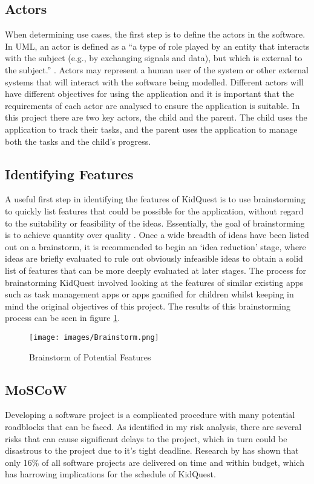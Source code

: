 \subsection{Actors}
When determining use cases, the first step is to define the actors in the software.
In UML, an actor is defined as a ``a type of role played by an entity that interacts with the subject (e.g., by exchanging signals and data), but which is external to the subject.'' \citep[p586-588]{omg2007unified}.
Actors may represent a human user of the system or other external systems that will interact with the software being modelled.
Different actors will have different objectives for using the application and it is important that the requirements of each actor are analysed to ensure the application is suitable.
In this project there are two key actors, the child and the parent. The child uses the application to track their tasks, and the parent uses the application to manage both the tasks and the child's progress.

\subsection{Identifying Features}
A useful first step in identifying the features of KidQuest is to use brainstorming to quickly list features that could be possible for the application, without regard to the suitability or feasibility of the ideas.
Essentially, the goal of brainstorming is to achieve quantity over quality \citep[p.144]{leffingwell2000managing}.
Once a wide breadth of ideas have been listed out on a brainstorm, it is recommended to begin an `idea reduction' stage, where ideas are briefly evaluated to rule out obviously infeasible ideas to obtain a solid list of features that can be more deeply evaluated at later stages.
The process for brainstorming KidQuest involved looking at the features of similar existing apps such as task management apps or apps gamified for children whilst keeping in mind the original objectives of this project.
The results of this brainstorming process can be seen in figure \ref{fig:brainstorm}.

\begin{figure}[ht]
	\centering
	\texttt{[image: images/Brainstorm.png]}
	\caption{Brainstorm of Potential Features}
	\label{fig:brainstorm}
\end{figure} 

\subsection{MoSCoW}
Developing a software project is a complicated procedure with many potential roadblocks that can be faced.
As identified in my risk analysis, there are several risks that can cause significant delays to the project, which in turn could be disastrous to the project due to it's tight deadline.
Research by \cite{requirementsprioritization} has shown that only 16\% of all software projects are delivered on time and within budget, which has harrowing implications for the schedule of KidQuest.

